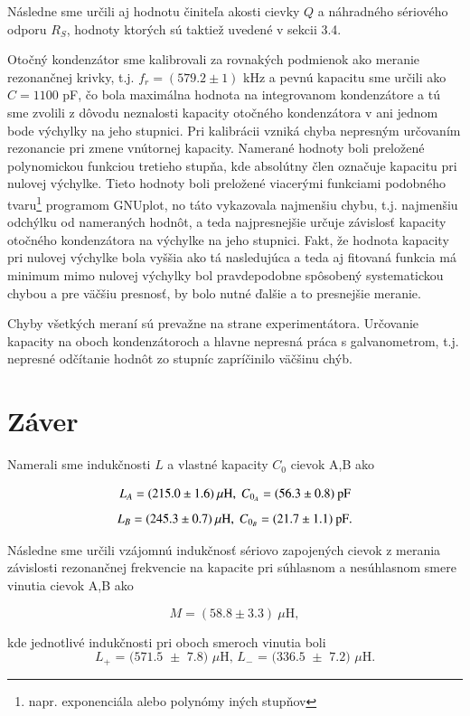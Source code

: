 \documentclass{article}
\begin{document}
Následne sme určili aj hodnotu činiteľa akosti cievky $Q$ a náhradného sériového odporu $R_S$, hodnoty ktorých sú taktiež uvedené v sekcii 3.4.

Otočný kondenzátor sme kalibrovali za rovnakých podmienok ako meranie rezonančnej krivky, t.j. $f_r = (579.2 \pm 1)$ kHz a pevnú kapacitu sme určili ako $C = 1100$ pF, čo bola maximálna hodnota na integrovanom kondenzátore a tú sme zvolili z dôvodu neznalosti kapacity otočného kondenzátora v ani jednom bode výchylky na jeho stupnici. Pri kalibrácii vzniká chyba nepresným určovaním rezonancie pri zmene vnútornej kapacity. Namerané hodnoty boli preložené polynomickou funkciou tretieho stupňa, kde absolútny člen označuje kapacitu pri nulovej výchylke. Tieto hodnoty boli preložené viacerými funkciami podobného tvaru\footnote{napr. exponenciála alebo polynómy iných stupňov} programom GNUplot, no táto vykazovala najmenšiu chybu, t.j. najmenšiu odchýlku od nameraných hodnôt, a teda najpresnejšie určuje závislosť kapacity otočného kondenzátora na výchylke na jeho stupnici. Fakt, že hodnota kapacity pri nulovej výchylke bola vyššia ako tá nasledujúca a teda aj fitovaná funkcia má minimum mimo nulovej výchylky bol pravdepodobne spôsobený systematickou chybou a pre väčšiu presnosť, by bolo nutné ďalšie a to presnejšie meranie.

Chyby všetkých meraní sú prevažne na strane experimentátora. Určovanie kapacity na oboch kondenzátoroch a hlavne nepresná práca s galvanometrom, t.j. nepresné odčítanie hodnôt zo stupníc zapríčinilo väčšinu chýb. 

\section{Záver}
Namerali sme indukčnosti $L$ a vlastné kapacity $C_0$ cievok A,B ako 

$$L_A = (215.0 \pm 1.6)\: {\mu}\text{H},\; C_{0_A} = (56.3 \pm 0.8)\text\: \text{pF}$$
$$L_B = (245.3 \pm 0.7)\: {\mu}\text{H},\; C_{0_B} = (21.7 \pm 1.1)\text\: \text{pF}.$$

Následne sme určili vzájomnú indukčnosť sériovo zapojených cievok z merania závislosti rezonančnej frekvencie na kapacite pri súhlasnom a nesúhlasnom smere vinutia cievok A,B ako

$$ M = (58.8 \pm 3.3) \: {\mu}\text{H},$$

kde jednotlivé indukčnosti pri oboch smeroch vinutia boli
$$ \text{$L_+$ = (571.5 $\pm$ 7.8) $\mu$H, $L_-$ = (336.5 $\pm$ 7.2) $\mu$H}.$$
\end{document}
